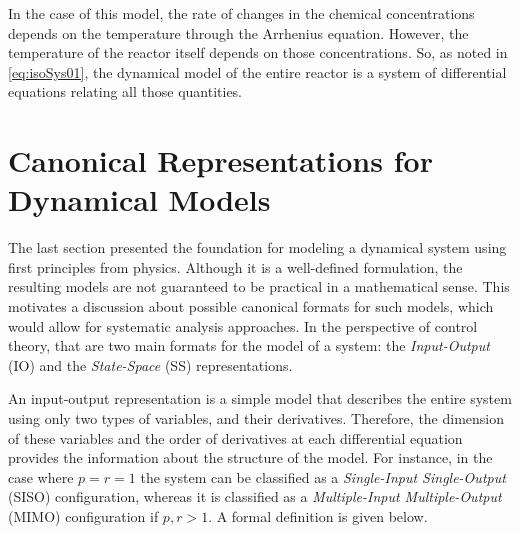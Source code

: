 \documentclass[a4paper,11pt]{book}
\numberwithin{figure}{chapter}
\numberwithin{equation}{chapter}
\numberwithin{table}{chapter}
\theoremstyle{definition}
\begin{document}
In the case of this model, the rate of changes in the chemical concentrations depends on the temperature through the Arrhenius equation. However, the temperature of the reactor itself depends on those concentrations. So, as noted in \eqref{eq:isoSys01}, the dynamical model of the entire reactor is a system of differential equations relating all those quantities.


\section{Canonical Representations for Dynamical Models}

The last section presented the foundation for modeling a dynamical system using first principles from physics. Although it is a well-defined formulation, the resulting models are not guaranteed to be practical in a mathematical sense. This motivates a discussion about possible canonical formats for such models, which would allow for systematic analysis approaches. In the perspective of control theory, that are two main formats for the model of a system: the \textit{Input-Output} (IO) and the \textit{State-Space} (SS) representations.

An input-output representation is a simple model that describes the entire system using only two types of variables, and their derivatives. Therefore, the dimension of these variables and the order of derivatives at each differential equation provides the information about the structure of the model. For instance, in the case where $p = r = 1$ the system can be classified as a \textit{Single-Input Single-Output} (SISO) configuration, whereas it is classified as a \textit{Multiple-Input Multiple-Output} (MIMO) configuration if $p,r > 1$. A formal definition is given below.
\end{document}
